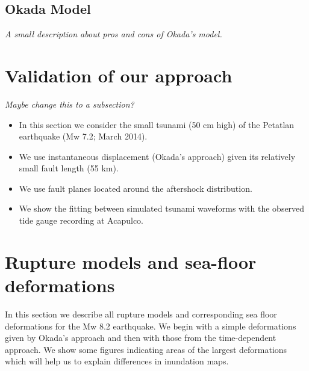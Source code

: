 \documentclass[preprint,review,12pt]{elsarticle}
\begin{document}

\subsection{Okada Model} \label{sub:okada}

\emph{A small description about pros and cons of Okada's model.}

\section{Validation of our approach} \label{sec:validation}
\emph{Maybe change this to a subsection?}
\begin{itemize}
  \item In this section we consider the small tsunami (50 cm high) of the Petatlan earthquake (Mw 7.2; March 2014). 
  \item We use instantaneous displacement (Okada's approach) given its relatively small fault length (55 km).
  \item We use fault planes located around the aftershock distribution.
  \item We show the fitting between simulated tsunami waveforms with the observed tide gauge recording at Acapulco.
\end{itemize}

\section{Rupture models and sea-floor deformations} \label{sec:rupture_models}

In this section we describe all rupture models and corresponding sea floor deformations for the Mw 8.2 earthquake. We begin with a simple deformations given by Okada's approach and then with those from the time-dependent approach. We show some figures indicating areas of the largest deformations which will help us to explain differences in inundation maps.
\end{document}
